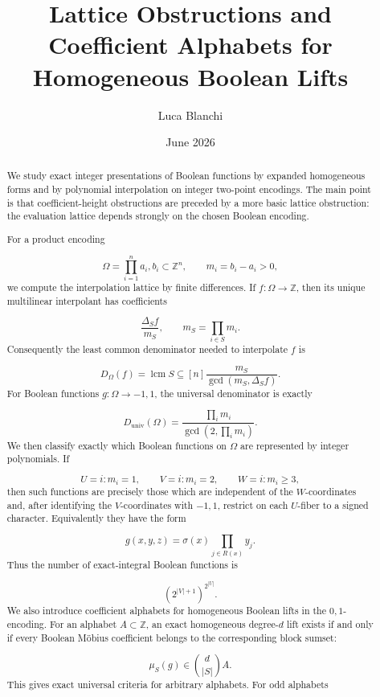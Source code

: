 \documentclass[11pt]{article}
\theoremstyle{definition}
\begin{document}
\title{Lattice Obstructions and Coefficient Alphabets for Homogeneous Boolean Lifts}
\author{Luca Blanchi}
\date{June 2026}

\maketitle

\begin{abstract}
We study exact integer presentations of Boolean functions by expanded homogeneous forms and by polynomial interpolation on integer two-point encodings. The main point is that coefficient-height obstructions are preceded by a more basic lattice obstruction: the evaluation lattice depends strongly on the chosen Boolean encoding.

For a product encoding

\[
\Omega=\prod_{i=1}^n{a_i,b_i}\subset \mathbb{Z}^n,
\qquad m_i=b_i-a_i>0,
\]
we compute the interpolation lattice by finite differences. If $f:\Omega\to\mathbb{Z}$, then its unique multilinear interpolant has coefficients

\[
\frac{\Delta_S f}{m_S},
\qquad
m_S=\prod_{i\in S}m_i.
\]
Consequently the least common denominator needed to interpolate $f$ is

\[
D_\Omega(f)=
\operatorname{lcm}{S\subseteq[n]}
\frac{m_S}{\gcd(m_S,\Delta_S f)}.
\]
For Boolean functions $g:\Omega\to{-1,1}$, the universal denominator is exactly

\[
D_{\mathrm{univ}}(\Omega)
=
\frac{\prod_i m_i}{\gcd(2,\prod_i m_i)}.
\]
We then classify exactly which Boolean functions on $\Omega$ are represented by integer polynomials. If

\[
U={i:m_i=1},\qquad
V={i:m_i=2},\qquad
W={i:m_i\ge3},
\]
then such functions are precisely those which are independent of the $W$-coordinates and, after identifying the $V$-coordinates with ${-1,1}$, restrict on each $U$-fiber to a signed character. Equivalently they have the form

\[
g(x,y,z)=\sigma(x)\prod_{j\in R(x)}y_j.
\]
Thus the number of exact-integral Boolean functions is

\[
\left(2^{|V|+1}\right)^{2^{|U|}}.
\]
We also introduce coefficient alphabets for homogeneous Boolean lifts in the ${0,1}$-encoding. For an alphabet $A\subset\mathbb{Z}$, an exact homogeneous degree-$d$ lift exists if and only if every Boolean Möbius coefficient belongs to the corresponding block sumset:

\[
\mu_S(g)\in \binom d{|S|}A.
\]
This gives exact universal criteria for arbitrary alphabets. For odd alphabets


\end{abstract}
\end{document}
